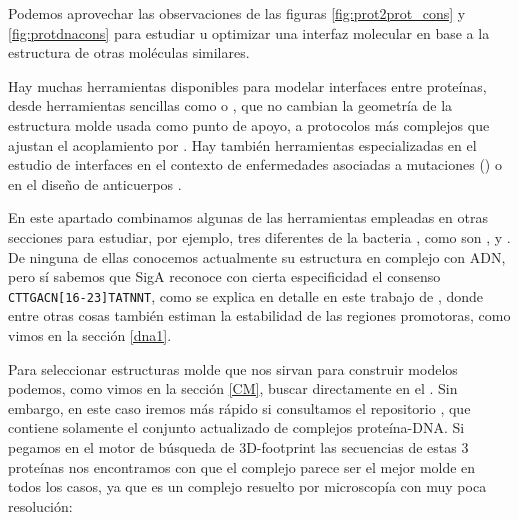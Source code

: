 Podemos aprovechar las observaciones de las figuras \ref{fig:prot2prot_cons} y \ref{fig:protdnacons}  
para estudiar u optimizar una interfaz molecular en base a la estructura de otras mol\'{e}culas similares.

Hay muchas herramientas disponibles para modelar interfaces entre prote\'{i}nas,
desde herramientas sencillas como 
 o
,
que no cambian la geometr\'{i}a de la estructura molde usada como punto de apoyo,
a protocolos m\'{a}s complejos que ajustan el acoplamiento por .
Hay tambi\'{e}n herramientas especializadas en el estudio de interfaces en el contexto
de enfermedades asociadas a mutaciones ()
o en el dise\~{n}o de anticuerpos \citep{Lapidoth2015,Baran2017}.

En este apartado combinamos algunas de las herramientas empleadas en otras secciones para estudiar, por ejemplo, tres diferentes 
de la bacteria , 
como son ,
 y
.
De ninguna de ellas conocemos actualmente su estructura en complejo con ADN,
pero s\'{i} sabemos que SigA reconoce con cierta especificidad el consenso \verb+CTTGACN[16-23]TATNNT+, 
como se explica en detalle en este trabajo de \cite{RamirezRomero2006}, 
donde entre otras cosas tambi\'{e}n estiman la estabilidad
de las regiones promotoras, como vimos en la secci\'{o}n \ref{dna1}.

Para seleccionar estructuras molde que nos sirvan para construir modelos podemos,
como vimos en la secci\'{o}n \ref{CM}, buscar directamente en el .
Sin embargo, en este caso iremos m\'{a}s r\'{a}pido si consultamos el repositorio 
 \citep{ContrerasMoreira2010}, 
que contiene solamente el conjunto actualizado de complejos prote\'{i}na-DNA.
Si pegamos en el motor de b\'{u}squeda de 3D-footprint las secuencias de estas 3 prote\'{i}nas
nos encontramos con que el complejo 
parece ser el mejor molde en todos los casos, ya que 
es un complejo resuelto por microscop\'{i}a con muy poca resoluci\'{o}n:

